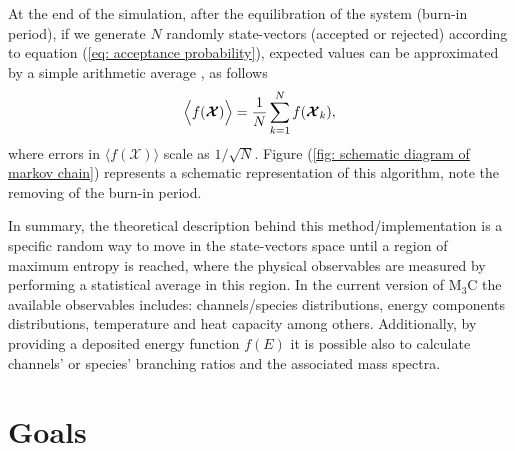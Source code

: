 \documentclass[a4paper,12pt]{article}
\begin{document}
At the end of the simulation, after the equilibration of the system (burn-in period), if we generate $N$
randomly state-vectors (accepted or rejected) according to equation (\ref{eq: acceptance probability}), expected values can be approximated by 
a simple arithmetic average
, as follows
\begin{equation}
\Bigl\langle f(\boldsymbol{\mathcal{X}}) \Bigr\rangle = \frac{1}{N}\sum_{k=1}^{N}f(\boldsymbol{\mathcal{X}}_k),
\label{eq: averages in state vectors final}
\end{equation}
where errors in $\langle f(\boldsymbol{\mathcal{X}}) \rangle$ scale as $1/\sqrt{N}$. Figure (\ref{fig: schematic diagram of markov chain})
represents a schematic representation of this algorithm, note the removing of the burn-in period.

In summary, the theoretical description behind this method/implementation is a specific random way to move in the state-vectors space until a
region of maximum entropy is reached, where the physical observables are measured by performing a statistical average 
in this region. In the current version of M$_3$C the available observables includes: channels/species distributions,
energy components distributions, temperature and heat capacity among others. Additionally, by providing a deposited 
energy function $f(E)$
it is possible also to calculate channels' or species' branching ratios and the associated mass spectra.

\section{Goals}
\end{document}
